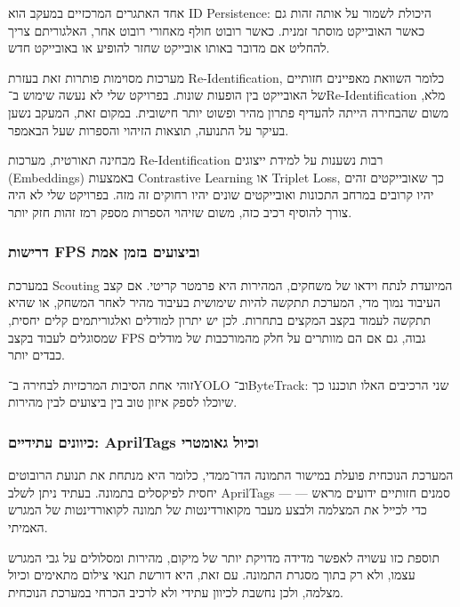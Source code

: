 אחד האתגרים המרכזיים במעקב הוא \textenglish{ID Persistence}: היכולת
לשמור על אותה זהות גם כאשר האובייקט מוסתר זמנית. כאשר רובוט חולף
מאחורי רובוט אחר, האלגוריתם צריך להחליט אם מדובר באותו אובייקט שחזר
להופיע או באובייקט חדש.

מערכות מסוימות פותרות זאת בעזרת \textenglish{Re-Identification}, כלומר
השוואת מאפיינים חזותיים של האובייקט בין הופעות שונות. בפרויקט שלי לא
נעשה שימוש ב־\textenglish{Re-Identification} מלא, משום שהבחירה הייתה
להעדיף פתרון מהיר ופשוט יותר חישובית. במקום זאת, המעקב נשען בעיקר על
התנועה, תוצאות הזיהוי והספרות שעל הבאמפר.

מבחינה תאורטית, מערכות \textenglish{Re-Identification} רבות נשענות על
למידת ייצוגים (\textenglish{Embeddings}) באמצעות \textenglish{Contrastive
Learning} או \textenglish{Triplet Loss}, כך שאובייקטים זהים יהיו קרובים
במרחב התכונות ואובייקטים שונים יהיו רחוקים זה מזה. בפרויקט שלי לא היה
צורך להוסיף רכיב כזה, משום שזיהוי הספרות מספק רמז זהות חזק יותר.

\subsubsection{דרישות \textenglish{FPS} וביצועים בזמן אמת}

במערכת \textenglish{Scouting} המיועדת לנתח וידאו של משחקים, המהירות
היא פרמטר קריטי. אם קצב העיבוד נמוך מדי, המערכת תתקשה להיות שימושית
בעיבוד מהיר לאחר המשחק, או שהיא תתקשה לעמוד בקצב המקצים בתחרות. לכן יש
יתרון למודלים ואלגוריתמים קלים יחסית, שמסוגלים לעבוד בקצב
\textenglish{FPS} גבוה, גם אם הם מוותרים על חלק מהמורכבות של מודלים
כבדים יותר.

זוהי אחת הסיבות המרכזיות לבחירה ב־\textenglish{YOLO}
וב־\textenglish{ByteTrack}: שני הרכיבים האלו תוכננו כך שיוכלו לספק
איזון טוב בין ביצועים לבין מהירות.

\subsubsection{כיוונים עתידיים: \textenglish{AprilTags} וכיול גאומטרי}

המערכת הנוכחית פועלת במישור התמונה הדו־ממדי, כלומר היא מנתחת את תנועת
הרובוטים יחסית לפיקסלים בתמונה. בעתיד ניתן לשלב
\textenglish{AprilTags} — סמנים חזותיים ידועים מראש — כדי לכייל את
המצלמה ולבצע מעבר מקואורדינטות של תמונה לקואורדינטות של המגרש האמיתי.

תוספת כזו עשויה לאפשר מדידה מדויקת יותר של מיקום, מהירות ומסלולים על
גבי המגרש עצמו, ולא רק בתוך מסגרת התמונה. עם זאת, היא דורשת תנאי צילום
מתאימים וכיול מצלמה, ולכן נחשבת לכיוון עתידי ולא לרכיב הכרחי במערכת
הנוכחית.
